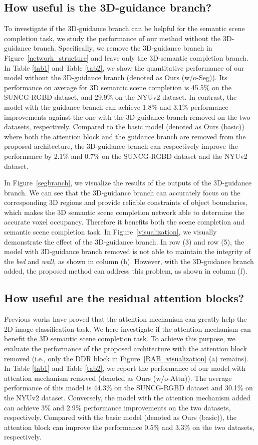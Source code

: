 \documentclass[letterpaper]{article} \usepackage{aaai20}  \usepackage{times}  \usepackage{helvet} \usepackage{courier}  \usepackage[hyphens]{url}  \usepackage{graphicx} \urlstyle{rm} \def\UrlFont{\rm}  \usepackage{graphicx}  \frenchspacing  \setlength{\pdfpagewidth}{8.5in}  \setlength{\pdfpageheight}{11in}
\begin{document}
\subsection{How useful is the 3D-guidance branch?}
\label{IsSegUseful}
To investigate if the 3D-guidance branch can be helpful for the semantic scene completion task, we study the performance of our method without the 3D-guidance branch. 
Specifically, we remove the 3D-guidance branch in Figure~\ref{network_structure} and leave only the 3D-semantic completion branch.
In Table \ref{tab1} and Table \ref{tab2}, we show the quantitative performance of our model without the 3D-guidance branch (denoted as Ours (w/o-Seg)).
Its performance on average for 3D semantic scene completion is 45.5\% on the SUNCG-RGBD dataset, and 29.9\% on the NYUv2 dataset. In contrast, the model with the guidance branch can achieve 1.8\% and 3.1\% performance improvements against the one with the 3D-guidance branch removed on the two datasets, respectively. Compared to the basic model (denoted as Ours (basic)) where both the attention block and the guidance branch are removed from the proposed architecture, the 3D-guidance branch can respectively improve the performance by 2.1\% and 0.7\% on the SUNCG-RGBD dataset and the NYUv2 dataset.


In Figure~\ref{segbranch}, we visualize the results of the outputs of the 3D-guidance branch. We can see that the 3D-guidance branch can accurately focus on the corresponding 3D regions and provide reliable constraints of object boundaries, which makes the 3D semantic scene completion network able to determine the accurate voxel occupancy. Therefore it benefits both the scene completion and semantic scene completion task.
In Figure~\ref{visualization}, we visually demonstrate the effect of the 3D-guidance branch. In row (3) and row (5), the model with 3D-guidance branch removed is not able to maintain the integrity of the \emph{bed} and \emph{wall}, as shown in column (h). However, with the 3D-guidance branch added, the proposed method can address this problem, as shown in column (f).


\subsection{How useful are the residual attention blocks?}
Previous works have proved that the attention mechanism can greatly help the 2D image classification task. We here investigate if the attention mechanism can benefit the 3D semantic scene completion task. To achieve this purpose, we evaluate the performance of the proposed architecture with the attention block removed (i.e., only the DDR block in Figure~\ref{RAB_visualization} (a) remains). In Table \ref{tab1} and Table \ref{tab2}, we report the performance of our model with attention mechanism removed (denoted as Ours (w/o-Attn)). The average performance of this model is 44.3\% on the SUNCG-RGBD dataset and 30.1\% on the NYUv2 dataset. Conversely, the model with the attention mechanism added can achieve 3\% and 2.9\% performance improvements on the two datasets, respectively. Compared with the basic model (denoted as Ours (basic)), the attention block can improve the performance 0.5\% and 3.3\% on the two datasets, respectively.
\end{document}
